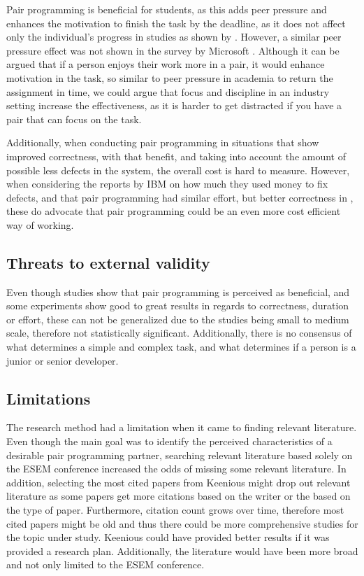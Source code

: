 \documentclass[conference]{IEEEtran}
\begin{document}
Pair programming is beneficial for students, as this adds peer pressure and enhances the motivation to finish the task by the deadline, as it does not affect only the individual's progress in studies as shown by \cite{Williams2000Strengthening}. However, a similar peer pressure effect was not shown in the survey by Microsoft \cite{10.1145/1414004.1414026}. Although it can be argued that if a person enjoys their work more in a pair, it would enhance motivation in the task, so similar to peer pressure in academia to return the assignment in time, we could argue that focus and discipline in an industry setting increase the effectiveness, as it is harder to get distracted if you have a pair that can focus on the task.

Additionally, when conducting pair programming in situations that show improved correctness, with that benefit, and taking into account the amount of possible less defects in the system, the overall cost is hard to measure. However, when considering the reports by IBM \cite{10.5555/377517.377531} on how much they used money to fix defects, and that pair programming had similar effort, but better correctness in \cite{10.1145/1159733.1159749}, these do advocate that pair programming could be an even more cost efficient way of working.

\subsection{Threats to external validity}

Even though studies show that pair programming is perceived as beneficial, and some experiments show good to great results in regards to correctness, duration or effort, these can not be generalized due to the studies being small to medium scale, therefore not statistically significant. Additionally, there is no consensus of what determines a simple and complex task, and what determines if a person is a junior or senior developer.

\subsection{Limitations}

The research method had a limitation when it came to finding relevant literature. Even though the main goal was to identify the perceived characteristics of a desirable pair programming partner, searching relevant literature based solely on the ESEM conference increased the odds of missing some relevant literature. In addition, selecting the most cited papers from Keenious might drop out relevant literature as some papers get more citations based on the writer or the based on the type of paper. Furthermore, citation count grows over time, therefore most cited papers might be old and thus there could be more comprehensive studies for the topic under study. Keenious could have provided better results if it was provided a research plan. Additionally, the literature would have been more broad and not only limited to the ESEM conference.
\end{document}
